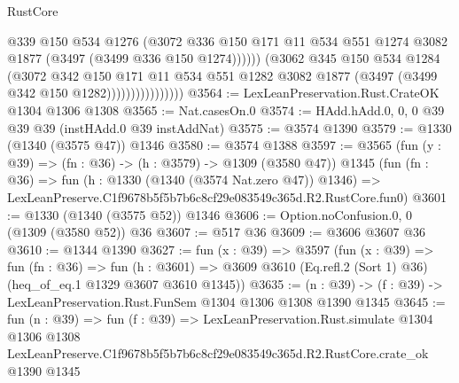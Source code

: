 \begin{lexlean}{RustCore}
\begin{coremodule}
                                  @339
                                  @150
                                  @534
                                  @1276
                                  (@3072
                                    @336
                                    @150
                                    @171
                                    @11
                                    @534
                                    @551
                                    @1274
                                    @3082
                                    @1877
                                    (@3497 (@3499 @336 @150 @1274))))))
                            (@3062
                              @345
                              @150
                              @534
                              @1284
                              (@3072
                                @342
                                @150
                                @171
                                @11
                                @534
                                @551
                                @1282
                                @3082
                                @1877
                                (@3497 (@3499 @342 @150 @1282))))))))))))))))
@3564 := LexLeanPreservation.Rust.CrateOK @1304 @1306 @1308
@3565 := Nat.casesOn.{0}
@3574 := HAdd.hAdd.{0, 0, 0} @39 @39 @39 (instHAdd.{0} @39 instAddNat)
@3575 := @3574 @1390
@3579 := @1330 (@1340 (@3575 @47)) @1346
@3580 := @3574 @1388
@3597 := @3565
    (fun (y : @39) => (fn : @36) -> (h : @3579) -> @1309 (@3580 @47))
    @1345
    (fun (fn : @36) =>
    fun (h : @1330 (@1340 (@3574 Nat.zero @47)) @1346) =>
    LexLeanPreserve.C1f9678b5f5b7b6c8cf29e083549c365d.R2.RustCore.fun0)
@3601 := @1330 (@1340 (@3575 @52)) @1346
@3606 := Option.noConfusion.{0, 0} (@1309 (@3580 @52)) @36
@3607 := @517 @36
@3609 := @3606 @3607 @36
@3610 := @1344 @1390
@3627 := fun (x : @39) =>
  @3597
    (fun (x : @39) =>
    fun (fn : @36) =>
    fun (h : @3601) =>
    @3609 @3610 (Eq.refl.{2} (Sort 1) @36) (heq_of_eq.{1} @1329 @3607 @3610 @1345))
@3635 := (n : @39) -> (f : @39) -> LexLeanPreservation.Rust.FunSem @1304 @1306 @1308 @1390 @1345
@3645 := fun (n : @39) =>
  fun (f : @39) =>
  LexLeanPreservation.Rust.simulate
    @1304
    @1306
    @1308
    LexLeanPreserve.C1f9678b5f5b7b6c8cf29e083549c365d.R2.RustCore.crate_ok
    @1390
    @1345
\end{coremodule}
\end{lexlean}

